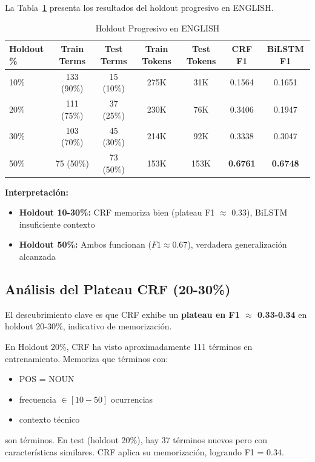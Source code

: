 La Tabla~\ref{tab:holdout_en} presenta los resultados del holdout progresivo en ENGLISH.

\begin{table}[H]
\centering
\caption{Holdout Progresivo en ENGLISH}
\label{tab:holdout_en}
\begin{tabular}{lcccccc}
\toprule
\textbf{Holdout \%} & \textbf{Train Terms} & \textbf{Test Terms} & \textbf{Train Tokens} & \textbf{Test Tokens} & \textbf{CRF F1} & \textbf{BiLSTM F1} \\
\midrule
10\% & 133 (90\%) & 15 (10\%) & 275K & 31K & 0.1564 & 0.1651 \\
20\% & 111 (75\%) & 37 (25\%) & 230K & 76K & 0.3406 & 0.1947 \\
30\% & 103 (70\%) & 45 (30\%) & 214K & 92K & 0.3338 & 0.3047 \\
50\% & 75 (50\%) & 73 (50\%) & 153K & 153K & \textbf{0.6761} & \textbf{0.6748} \\
\bottomrule
\end{tabular}
\end{table}

\textbf{Interpretación:}
\begin{itemize}
    \item \textbf{Holdout 10-30\%:} CRF memoriza bien (plateau F1 $\approx$ 0.33), BiLSTM insuficiente contexto
    \item \textbf{Holdout 50\%:} Ambos funcionan ($F1 \approx 0.67$), verdadera generalización alcanzada
\end{itemize}

\subsection{Análisis del Plateau CRF (20-30\%)}

El descubrimiento clave es que CRF exhibe un \textbf{plateau en F1 $\approx$ 0.33-0.34} en holdout 20-30\%, indicativo de memorización.

En Holdout 20\%, CRF ha visto aproximadamente 111 términos en entrenamiento. Memoriza que términos con:
\begin{itemize}
    \item POS = NOUN
    \item frecuencia $\in [10-50]$ ocurrencias
    \item contexto técnico
\end{itemize}

son términos. En test (holdout 20\%), hay 37 términos nuevos pero con características similares. CRF aplica su memorización, logrando F1 = 0.34.

